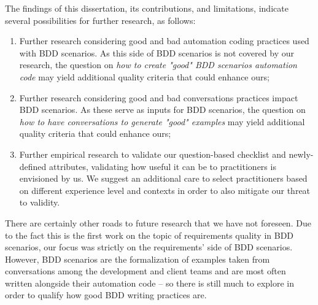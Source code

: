 The findings of this dissertation, its contributions, and limitations, indicate several possibilities for further research, as follows:

\begin{enumerate}
    \item Further research considering good and bad automation coding practices used with BDD scenarios. As this side of BDD scenarios is not covered by our research, the question on \textit{how to create "good" BDD scenarios automation code} may yield additional quality criteria that could enhance ours;
    \item Further research considering good and bad conversations practices impact BDD scenarios. As these serve as inputs for BDD scenarios, the question on \textit{how to have conversations to generate "good" examples} may yield additional quality criteria that could enhance ours;
    \item Further empirical research to validate our question-based checklist and newly-defined attributes, validating how useful it can be to practitioners is envisioned by us. We suggest an additional care to select practitioners based on different experience level and contexts in order to also mitigate our threat to validity. 
\end{enumerate}

There are certainly other roads to future research that we have not foreseen. Due to the fact this is the first work on the topic of requirements quality in BDD scenarios, our focus was strictly on the requirements' side of BDD scenarios. However, BDD scenarios are the formalization of examples taken from conversations among the development and client teams and are most often written alongside their automation code -- so there is still much to explore in order to qualify how good BDD writing practices are.
